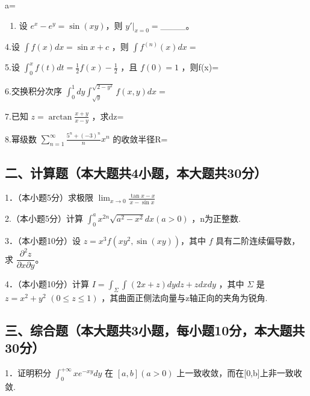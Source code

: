 \documentclass[11pt,fontset=fandol]{ctexart}
\providecommand{\tightlist}{\setlength{\itemsep}{0pt}\setlength{\parskip}{0pt}}
\begin{document}
a=

\begin{enumerate}
\def\labelenumi{\arabic{enumi}.}
\setcounter{enumi}{2}
\tightlist
\item
  设 \(e^x-e^y=\sin(xy)\)，则 \(y'|_{x=0}=\)\_\_\_\_。
\end{enumerate}

4.设 \(\int f ( x ) d x = \sin { x } + c\) ，则
\(\int f ^ { ( n ) } ( x ) d x =\)

5.设
\(\int _ { 0 } ^ { x } f \left( t \right) d t = \frac { 1 } { 2 } f ( x ) - \frac { 1 } { 2 }\)
，且 \(f ( 0 ) = 1\) ，则f(x)=

6.交换积分次序
\(\int _ { 0 } ^ { 1 } d y \int _ { \sqrt { y } } ^ { \sqrt { 2 - y ^ { 2 } } } f ( x , y ) d x =\)

7.已知 \(z = \arctan \frac { x + y } { x - y }\) ，求dz=

8.幂级数
\(\sum _ { n = 1 } ^ { \infty } { \frac { 5 ^ { n } + ( - 3 ) ^ { n } } { n } } x ^ { n }\)
的收敛半径R=

\subsection{二、计算题（本大题共4小题，本大题共30分）}\label{ux4e8cux8ba1ux7b97ux9898ux672cux5927ux9898ux51714ux5c0fux9898ux672cux5927ux9898ux517130ux5206}

1．（本小题5分）求极限
\(\lim _ { x \to 0 } { \frac { \tan x - x } { x - \sin x } }\)

2.（本小题5分）计算
\(\int _ { 0 } ^ { a } x ^ { 2 n } { \sqrt { a ^ { 2 } - x ^ { 2 } } } d x \left( a > 0 \right)\)
，n为正整数.

3．（本小题10分）设 \(z=x^3f(xy^2,\sin(xy))\)，其中 \(f\)
具有二阶连续偏导数，求 \(\dfrac{\partial^2z}{\partial x\partial y}\)。

4．（本小题10分）计算
\(I = \int _ { \Sigma } \int _ { } ( 2 x + z ) d y d z + z d x d y\)
，其中 \(\Sigma\) 是 \(z = x ^ { 2 } + y ^ { 2 }\)
\(( 0 \leq z \leq 1 )\) ，其曲面正侧法向量与z轴正向的夹角为锐角.

\subsection{三、综合题（本大题共3小题，每小题10分，本大题共30分）}\label{ux4e09ux7efcux5408ux9898ux672cux5927ux9898ux51713ux5c0fux9898ux6bcfux5c0fux989810ux5206ux672cux5927ux9898ux517130ux5206}

1．证明积分 \(\int _ { 0 } ^ { + \infty } x e ^ { - x y } d y\) 在
\([ a , b ] ( a > 0 )\) 上一致收敛，而在{[}0,b{]}上非一致收敛.
\end{document}

